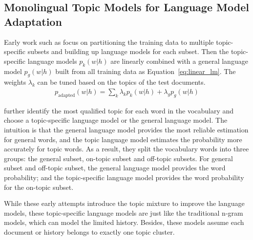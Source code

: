 \subsection{Monolingual Topic Models for Language Model Adaptation}

Early work such as \citet{Clarkson-1997,Seymore-1997,Kneser-1997,Iyer-1999} focus on partitioning the training data to multiple topic-specific subsets and building up language models for each subset. Then the topic-specific language models $p_k(w|h)$ are linearly combined with a general language model $p_g(w|h)$ built from all training data as Equation~\ref{eq:linear_lm}. The weights $\lambda_k$ can be tuned based on the topics of the test documents. 
\begin{align}
\label{eq:linear_lm}
p_\textrm{adapted}(w|h) = \sum_k \lambda_k p_k(w|h) + \lambda_g p_g(w|h)
\end{align} 

\citet{Seymore-1998} further identify the most qualified topic for each word in the vocabulary and choose a topic-specific language model or the general language model. The intuition is that the general language model provides the most reliable estimation for general words, and the topic language model estimates the probability more accurately for topic words. As a result, they split the vocabulary words into three groups: the general subset, on-topic subset and off-topic subsets. For general subset and off-topic subset, the general language model provides the word probability; and the topic-specific language model provides the word probability for the on-topic subset. 

While these early attempts introduce the topic mixture to improve the language models, these topic-specific language models are just like the traditional n-gram models, which can model the limited history. Besides, these models assume each document or history belongs to exactly one topic cluster. 

